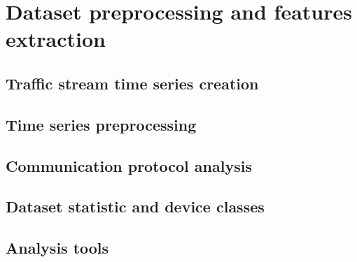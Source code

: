 \chapter{Dataset preprocessing and features extraction}\label{chap4}

\section{Traffic stream time series creation}
\lipsum[1]

\section{Time series preprocessing}
\lipsum[1]

\section{Communication protocol analysis}
\lipsum[1]

\section{Dataset statistic and device classes}
\lipsum[1]

\section{Analysis tools}
\lipsum[1]

